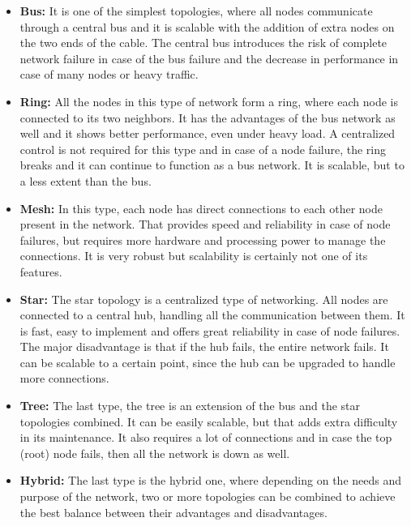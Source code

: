 \begin{itemize}
\item \textbf{Bus:}
It is one of the simplest topologies, where all nodes communicate through a central bus and it is scalable with the addition of extra nodes on the two ends of the cable.
The central bus introduces the risk of complete network failure in case of the bus failure and the decrease in performance in case of many nodes or heavy traffic.
\item \textbf{Ring:} All the nodes in this type of network form a ring, where each node is connected to its two neighbors.
It has the advantages of the bus network as well and it shows better performance, even under heavy load.
A centralized control is not required for this type and in case of a node failure, the ring breaks and it can continue to function as a bus network.
It is scalable, but to a less extent than the bus.
\item \textbf{Mesh:} In this type, each node has direct connections to each other node present in the network.
That provides speed and reliability in case of node failures, but requires more hardware and processing power to manage the connections.
It is very robust but scalability is certainly not one of its features.
\item \textbf{Star:} The star topology is a centralized type of networking.
All nodes are connected to a central hub, handling all the communication between them.
It is fast, easy to implement and offers great reliability in case of node failures.
The major disadvantage is that if the hub fails, the entire network fails.
It can be scalable to a certain point, since the hub can be upgraded to handle more connections.
\item \textbf{Tree:} The last type, the tree is an extension of the bus and the star topologies combined.
It can be easily scalable, but that adds extra difficulty in its maintenance.
It also requires a lot of connections and in case the top (root) node fails, then all the network is down as well.
\item \textbf{Hybrid:} The last type is the hybrid one, where depending on the needs and purpose of the network, two or more topologies can be combined to achieve the best balance between their advantages and disadvantages.
\end{itemize}

